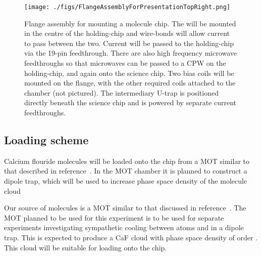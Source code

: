 \begin{figure}[ht]
  \texttt{[image: ./figs/FlangeAssemblyForPresentationTopRight.png]}
  \caption{
    Flange assembly for mounting a molecule chip. The  will be
    mounted in the centre of the holding-chip and wire-bonds will allow current
    to pass between the two. Current will be passed to the holding-chip via the
    19-pin feedthrough. There are also high frequency microwave feedthroughs so
    that microwaves can be passed to a CPW on the holding-chip, and again onto
    the science chip. Two bias coils will be mounted on the flange, with the
    other required coils attached to the chamber (not pictured). The
    intermediary U-trap is positioned directly beneath the science chip and is
    powered by separate current feedthroughs. 
  }
  \label{experiment:fig:flange}
\end{figure}


\subsection{Loading scheme}
\label{experiment:loading}

Calcium flouride molecules will be loaded onto the chip from a MOT similar to
that described in reference~\cite{Truppe2017}. In the MOT chamber it is planned
to construct a dipole trap, which will be used to increase phase space density
of the molecule cloud

Our source of  molecules is a MOT similar to that discussed in
reference~\cite{Truppe2017}. The MOT planned to be used for this experiment is
to be used for separate experiments investigating sympathetic cooling between
 atoms and  in a dipole trap. This is expected to produce a CaF
cloud with phase space density of order . This cloud will be suitable
for loading onto the chip.  

